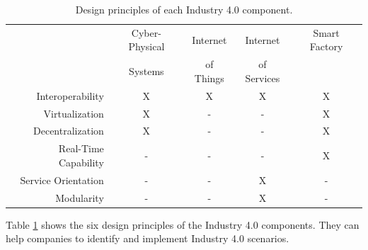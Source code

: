 \begin{table}[htpb]
  \centering
    \begin{tabular}{| r | c c c c |}
      \rowcolor{ob_orange}
      \hline
                            & Cyber-Physical & Internet  & Internet    & Smart Factory \\
      \rowcolor{ob_orange}
                            & Systems        & of Things & of Services &  \\
      \hline
      Interoperability      & X        & X        & X          & X    \\
      Virtualization        & X        & -        & -          & X    \\
      Decentralization      & X        & -        & -          & X    \\
      Real-Time Capability  & -        & -        & -          & X    \\
      Service Orientation   & -        & -        & X          & -    \\
      Modularity            & -        & -        & X          & -    \\
      \hline
    \end{tabular}
  \caption[Design principles of each Industry 4.0 component]{Design principles of each Industry 4.0 component.\autocite[cf.][p. 11]{Her:2015}}
  \label{tab:industryComponents}
\end{table}

Table \ref{tab:industryComponents} shows the six design principles of the Industry 4.0 components.
They can help companies to identify and implement Industry 4.0 scenarios.\autocite[cf.][p. 11]{Her:2015}

